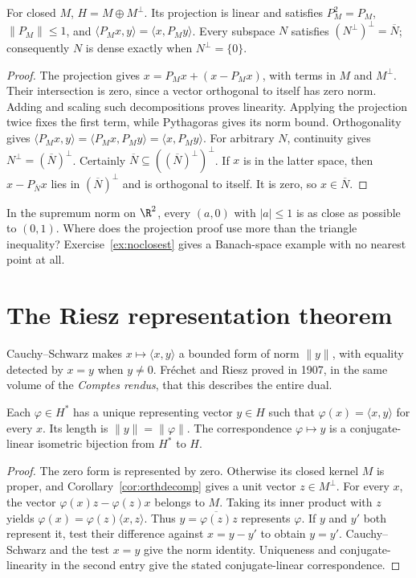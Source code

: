 \begin{corollary}\label{cor:orthdecomp}
For closed $M$, $H=M\oplus M^\perp$. Its projection is linear and satisfies $P_M^2=P_M$, $\|P_M\|\le1$, and $\langle P_Mx,y\rangle=\langle x,P_My\rangle$. Every subspace $N$ satisfies $(N^\perp)^\perp=\overline N$; consequently $N$ is dense exactly when $N^\perp=\{0\}$.
\end{corollary}
\begin{proof}
The projection gives $x=P_Mx+(x-P_Mx)$, with terms in $M$ and $M^\perp$. Their intersection is zero, since a vector orthogonal to itself has zero norm. Adding and scaling such decompositions proves linearity. Applying the projection twice fixes the first term, while Pythagoras gives its norm bound. Orthogonality gives $\langle P_Mx,y\rangle=\langle P_Mx,P_My\rangle=\langle x,P_My\rangle$. For arbitrary $N$, continuity gives $N^\perp=(\overline N)^\perp$. Certainly $\overline N\subseteq((\overline N)^\perp)^\perp$. If $x$ is in the latter space, then $x-P_{\overline N}x$ lies in $(\overline N)^\perp$ and is orthogonal to itself. It is zero, so $x\in\overline N$.
\end{proof}

\begin{think}
In the supremum norm on $\R^2$, every $(a,0)$ with $|a|\le1$ is as close as possible to $(0,1)$. Where does the projection proof use more than the triangle inequality? Exercise~\ref{ex:noclosest} gives a Banach-space example with no nearest point at all.
\end{think}

\section{The Riesz representation theorem}

Cauchy--Schwarz makes $x\mapsto\langle x,y\rangle$ a bounded form of norm $\|y\|$, with equality detected by $x=y$ when $y\ne0$. Fr\'echet and Riesz proved in 1907, in the same volume of the \emph{Comptes rendus}, that this describes the entire dual.

\begin{theorem}\label{thm:rieszrep}
Each $\varphi\in H^*$ has a unique representing vector $y\in H$ such that $\varphi(x)=\langle x,y\rangle$ for every $x$. Its length is $\|y\|=\|\varphi\|$. The correspondence $\varphi\mapsto y$ is a conjugate-linear isometric bijection from $H^*$ to $H$.
\end{theorem}
\begin{proof}
The zero form is represented by zero. Otherwise its closed kernel $M$ is proper, and Corollary~\ref{cor:orthdecomp} gives a unit vector $z\in M^\perp$. For every $x$, the vector $\varphi(x)z-\varphi(z)x$ belongs to $M$. Taking its inner product with $z$ yields $\varphi(x)=\varphi(z)\langle x,z\rangle$. Thus $y=\overline{\varphi(z)}z$ represents $\varphi$. If $y$ and $y'$ both represent it, test their difference against $x=y-y'$ to obtain $y=y'$. Cauchy--Schwarz and the test $x=y$ give the norm identity. Uniqueness and conjugate-linearity in the second entry give the stated conjugate-linear correspondence.
\end{proof}

